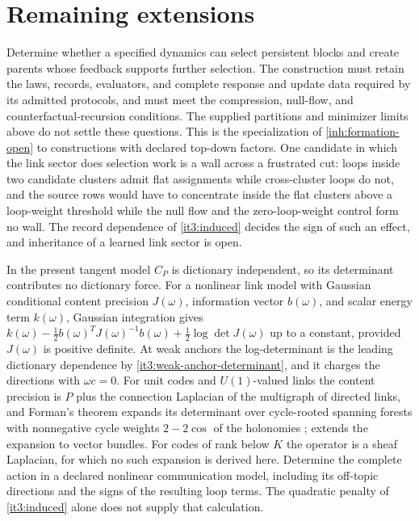 \section{Remaining extensions}
\label{it3:ch-next}

Determine whether a specified dynamics can select persistent blocks and create parents whose feedback supports further selection. The construction must retain the laws, records, evaluators, and complete response and update data required by its admitted protocols, and must meet the compression, null-flow, and counterfactual-recursion conditions. The supplied partitions and minimizer limits above do not settle these questions. This is the specialization of \cref{inh:formation-open} to constructions with declared top-down factors. One candidate in which the link sector does selection work is a wall across a frustrated cut: loops inside two candidate clusters admit flat assignments while cross-cluster loops do not, and the source rows would have to concentrate inside the flat clusters above a loop-weight threshold while the null flow and the zero-loop-weight control form no wall. The record dependence of \cref{it3:induced} decides the sign of such an effect, and inheritance of a learned link sector is open.

In the present tangent model $C_P$ is dictionary independent, so its determinant contributes no dictionary force. For a nonlinear link model with Gaussian conditional content precision $J(\omega)$, information vector $b(\omega)$, and scalar energy term $k(\omega)$, Gaussian integration gives
$k(\omega)-\frac12b(\omega)^TJ(\omega)^{-1}b(\omega)+\frac12\log\det J(\omega)$
up to a constant, provided $J(\omega)$ is positive definite. At weak anchors the log-determinant is the leading dictionary dependence by \cref{it3:weak-anchor-determinant}, and it charges the directions with $\omega c=0$. For unit codes and $U(1)$-valued links the content precision is $P$ plus the connection Laplacian of the multigraph of directed links, and Forman's theorem expands its determinant over cycle-rooted spanning forests with nonnegative cycle weights $2-2\cos$ of the holonomies \citep{Forman1993}; \citet{Kenyon2011} extends the expansion to vector bundles. For codes of rank below $K$ the operator is a sheaf Laplacian, for which no such expansion is derived here. Determine the complete action in a declared nonlinear communication model, including its off-topic directions and the signs of the resulting loop terms. The quadratic penalty of \cref{it3:induced} alone does not supply that calculation.

